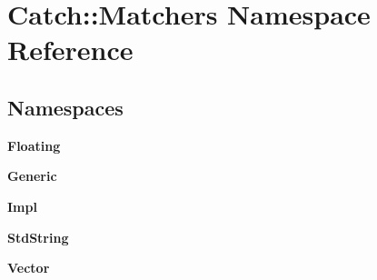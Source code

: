 \section{Catch\+::Matchers Namespace Reference}
\label{namespace_catch_1_1_matchers}
\subsection*{Namespaces}
\begin{DoxyCompactItemize}
\item 
 \textbf{ Floating}
\item 
 \textbf{ Generic}
\item 
 \textbf{ Impl}
\item 
 \textbf{ Std\+String}
\item 
 \textbf{ Vector}
\end{DoxyCompactItemize}
